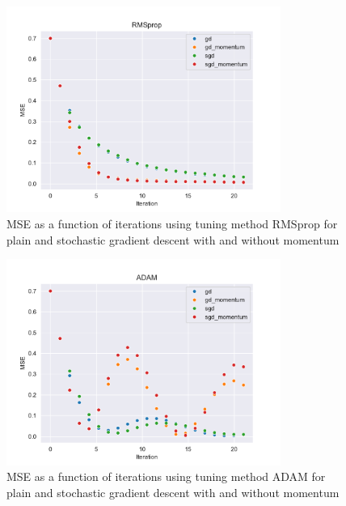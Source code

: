 \begin{figure}[H]
\centering
\includegraphics[width=0.8\textwidth]{Figures/PartA/RMSpropMSE(iter).pdf}
\caption{MSE as a function of iterations using tuning method RMSprop for plain and stochastic gradient descent with and without momentum}
\label{fig:RMSpropMSE-iter-pdf}
\end{figure}

\begin{figure}[H]
\centering
\includegraphics[width=0.8\textwidth]{Figures/PartA/ADAMMSE(iter).pdf}
\caption{MSE as a function of iterations using tuning method ADAM for plain and stochastic gradient descent with and without momentum}
\label{fig:ADAMMSE-iter-pdf}
\end{figure}



